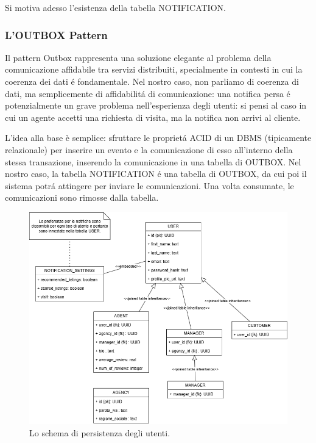 Si motiva adesso l'esistenza della tabella NOTIFICATION.
\subsubsection{L'OUTBOX Pattern}
Il pattern Outbox rappresenta una soluzione elegante al problema della comunicazione affidabile 
tra servizi distribuiti, specialmente in contesti in cui la coerenza dei dati é fondamentale.
Nel nostro caso, non parliamo di coerenza di dati, ma semplicemente di affidabilitá di comunicazione:
una notifica persa é potenzialmente un grave problema nell'esperienza degli utenti: si pensi al caso 
in cui un agente accetti una richiesta di visita, ma la notifica non arrivi al cliente.

L'idea alla base è semplice: sfruttare le proprietá ACID di un DBMS (tipicamente relazionale) per 
inserire un evento e la comunicazione di esso all'interno della stessa transazione, inserendo la 
comunicazione in una tabella di OUTBOX.
Nel nostro caso, la tabella NOTIFICATION é una tabella di OUTBOX, da cui poi il sistema
potrá attingere per inviare le comunicazioni. Una volta consumate, le comunicazioni sono
rimosse dalla tabella.

\begin{figure}[h]
    \centering
    \includegraphics[width=\textwidth]{assets/diagrams/db-scheme/users.png}
    \caption{Lo schema di persistenza degli utenti.}
    \label{fig:Schema di persistenza degli utenti}
\end{figure}


